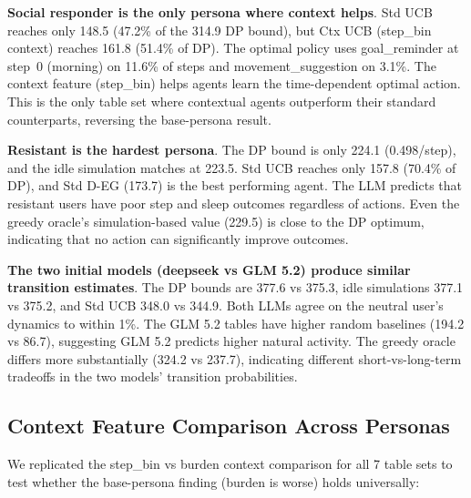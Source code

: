 \documentclass[11pt]{article}
\begin{document}
\textbf{Social responder is the only persona where context helps}. Std UCB reaches only 148.5 (47.2\% of the 314.9 DP bound), but Ctx UCB (step\_bin context) reaches 161.8 (51.4\% of DP). The optimal policy uses goal\_reminder at step~0 (morning) on 11.6\% of steps and movement\_suggestion on 3.1\%. The context feature (step\_bin) helps agents learn the time-dependent optimal action. This is the only table set where contextual agents outperform their standard counterparts, reversing the base-persona result.

\textbf{Resistant is the hardest persona}. The DP bound is only 224.1 (0.498/step), and the idle simulation matches at 223.5. Std UCB reaches only 157.8 (70.4\% of DP), and Std D-EG (173.7) is the best performing agent. The LLM predicts that resistant users have poor step and sleep outcomes regardless of actions. Even the greedy oracle's simulation-based value (229.5) is close to the DP optimum, indicating that no action can significantly improve outcomes.

\textbf{The two initial models (deepseek vs GLM 5.2) produce similar transition estimates}. The DP bounds are 377.6 vs 375.3, idle simulations 377.1 vs 375.2, and Std UCB 348.0 vs 344.9. Both LLMs agree on the neutral user's dynamics to within 1\%. The GLM 5.2 tables have higher random baselines (194.2 vs 86.7), suggesting GLM 5.2 predicts higher natural activity. The greedy oracle differs more substantially (324.2 vs 237.7), indicating different short-vs-long-term tradeoffs in the two models' transition probabilities.

\subsection{Context Feature Comparison Across Personas}

We replicated the step\_bin vs burden context comparison for all 7 table sets to test whether the base-persona finding (burden is worse) holds universally:
\end{document}

